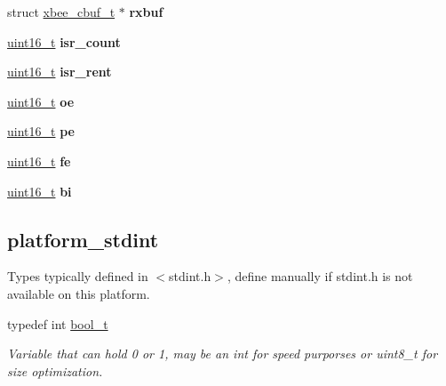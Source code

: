 \begin{DoxyCompactItemize}
\item 
\hypertarget{group__hal__dos_ga240ac56bdef04d1201432e8fbbd701a7}{struct \hyperlink{structxbee__cbuf__t}{xbee\-\_\-cbuf\-\_\-t} $\ast$ {\bfseries rxbuf}}\label{group__hal__dos_ga240ac56bdef04d1201432e8fbbd701a7}

\item 
\hypertarget{group__hal__dos_ga39ae4f38dd4106e5ad471dea876ea044}{\hyperlink{group__hal_ga5a8b2dc9e45a9ee81a94ef304fb62505}{uint16\-\_\-t} {\bfseries isr\-\_\-count}}\label{group__hal__dos_ga39ae4f38dd4106e5ad471dea876ea044}

\item 
\hypertarget{group__hal__dos_ga035e778219e705696ae1de6010c79f55}{\hyperlink{group__hal_ga5a8b2dc9e45a9ee81a94ef304fb62505}{uint16\-\_\-t} {\bfseries isr\-\_\-rent}}\label{group__hal__dos_ga035e778219e705696ae1de6010c79f55}

\item 
\hypertarget{group__hal__dos_ga044661106248e3b88b7367a25564e017}{\hyperlink{group__hal_ga5a8b2dc9e45a9ee81a94ef304fb62505}{uint16\-\_\-t} {\bfseries oe}}\label{group__hal__dos_ga044661106248e3b88b7367a25564e017}

\item 
\hypertarget{group__hal__dos_gac386d9b4162d246079f9d095ff3b3138}{\hyperlink{group__hal_ga5a8b2dc9e45a9ee81a94ef304fb62505}{uint16\-\_\-t} {\bfseries pe}}\label{group__hal__dos_gac386d9b4162d246079f9d095ff3b3138}

\item 
\hypertarget{group__hal__dos_gae1b2c519587a252d68482e46a9664571}{\hyperlink{group__hal_ga5a8b2dc9e45a9ee81a94ef304fb62505}{uint16\-\_\-t} {\bfseries fe}}\label{group__hal__dos_gae1b2c519587a252d68482e46a9664571}

\item 
\hypertarget{group__hal__dos_ga580a572991f81c74d0cf88bdccc3db88}{\hyperlink{group__hal_ga5a8b2dc9e45a9ee81a94ef304fb62505}{uint16\-\_\-t} {\bfseries bi}}\label{group__hal__dos_ga580a572991f81c74d0cf88bdccc3db88}

\end{DoxyCompactItemize}
\subsection*{platform\-\_\-stdint}
\label{_amgrpd25616584cb4ee40080d217a7b385214}%
Types typically defined in $<$stdint.\-h$>$, define manually if stdint.\-h is not available on this platform. \begin{DoxyCompactItemize}
\item 
\hypertarget{group__hal_ga04dd5074964518403bf944f2b240a5f8}{typedef int \hyperlink{group__hal_ga04dd5074964518403bf944f2b240a5f8}{bool\-\_\-t}}\label{group__hal_ga04dd5074964518403bf944f2b240a5f8}

\begin{DoxyCompactList}\small\item\em Variable that can hold 0 or 1, may be an {\ttfamily int} for speed purporses or {\ttfamily uint8\-\_\-t} for size optimization. \end{DoxyCompactList}\end{DoxyCompactItemize}


